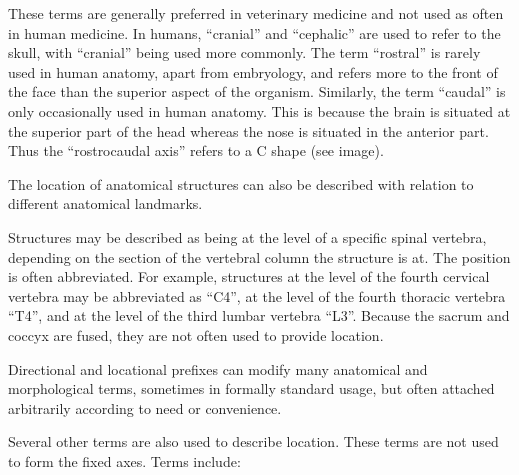 \documentclass[]{book}
\begin{document}
These terms are generally preferred in veterinary medicine and not used as often in human medicine. In humans, ``cranial'' and ``cephalic'' are used to refer to the skull, with ``cranial'' being used more commonly. The term ``rostral'' is rarely used in human anatomy, apart from embryology, and refers more to the front of the face than the superior aspect of the organism. Similarly, the term ``caudal'' is only occasionally used in human anatomy. This is because the brain is situated at the superior part of the head whereas the nose is situated in the anterior part. Thus the ``rostrocaudal axis'' refers to a C shape (see image).

The location of anatomical structures can also be described with relation to different anatomical landmarks.

Structures may be described as being at the level of a specific spinal vertebra, depending on the section of the vertebral column the structure is at. The position is often abbreviated. For example, structures at the level of the fourth cervical vertebra may be abbreviated as ``C4'', at the level of the fourth thoracic vertebra ``T4'', and at the level of the third lumbar vertebra ``L3''. Because the sacrum and coccyx are fused, they are not often used to provide location.

Directional and locational prefixes can modify many anatomical and morphological terms, sometimes in formally standard usage, but often attached arbitrarily according to need or convenience.

Several other terms are also used to describe location. These terms are not used to form the fixed axes. Terms include:
\end{document}

